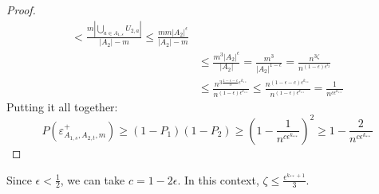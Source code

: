 \begin{proof}
\[\begin{split}
                            < \frac{m |\bigcup_{a \in A_{1,s}} U_{2,a}|}{|A_2| - m}
                            \leq \frac{m m |A_2|^\epsilon}{|A_2| - m} \\
                        & \leq \frac{m^3 |A_2|^\epsilon}{|A_2|}
                            = \frac{m^3}{|A_2|^{1-\epsilon}}
                            = \frac{n^{3 \zeta}}{n^{(1-\epsilon)\epsilon^{l_2}}} \\ %
                        & \leq \frac{n^{3\frac{1-\epsilon-c}{3} \epsilon^{k_{**}}}}{n^{(1-\epsilon)\epsilon^{k_{**}}}}
                            \leq \frac{n^{(1-\epsilon-c) \epsilon^{k_{**}}}}{n^{(1-\epsilon)\epsilon^{k_{**}}}}
                            = \frac{1}{n^{c \epsilon^{k_{**}}}}
                \end{split}
            \]
            Putting it all together:
            \[
                P(\varepsilon^+_{A_{1,s},A_{2,t},m})
                    \geq (1 - P_1) (1 - P_2)
                    \geq \left(1 - \frac{1}{n^{c \epsilon^{k_{**}}}}\right)^2
                    \geq 1 - \frac{2}{n^{c\epsilon^{k_{**}}}}
            \]
        \end{proof}

    \remark\label{subpair_bound_specification}
    Since $\epsilon < \frac{1}{2}$, we can take $c = 1 - 2\epsilon$.
    In this context, $\zeta \leq \frac{\epsilon^{k_{**}+1}}{3}$.


